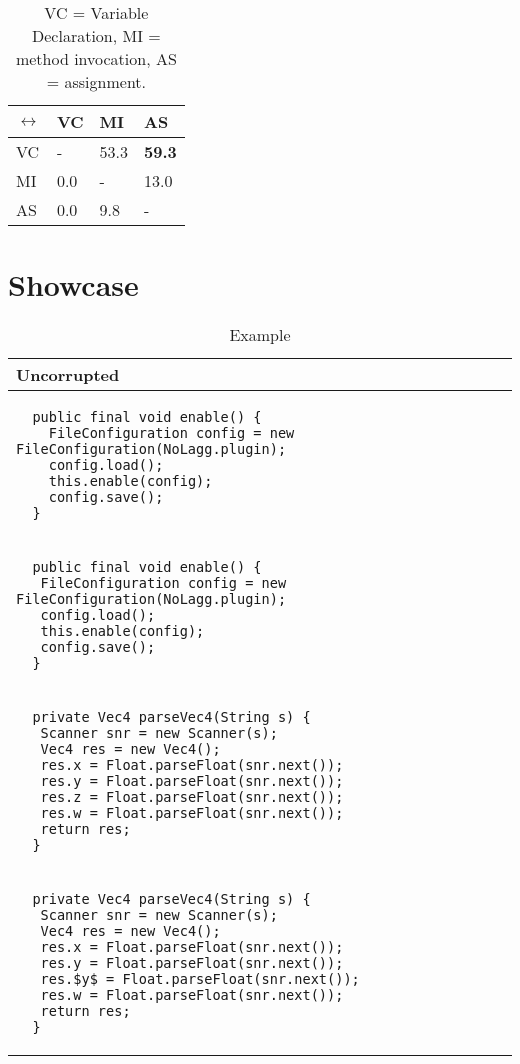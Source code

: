 \begin{table}[h]
\begin{tabular}{ | m{1cm} | m{1cm} | m{1cm} | m{1cm} | }
  \hline
  \(\leftrightarrow\) & VC & MI & AS \\
  \hline
  \hline
  VC & - & 53.3 & \textbf{59.3} \\
  \hline
  MI & 0.0 & - & 13.0 \\
  \hline
  AS & 0.0 & 9.8 & - \\
  \hline
\end{tabular}
\caption{VC = Variable Declaration, MI = method invocation, AS = assignment.}
\label{switch_table}
\end{table}

\section{Showcase}

\begin{table}[p]
\begin{tabular}{ | m{11cm} | }
  \hline
  Uncorrupted \\
  \hline
  \begin{lstlisting}
  public final void enable() {
    FileConfiguration config = new FileConfiguration(NoLagg.plugin);
    config.load();
    this.enable(config);
    config.save();
  }
  \end{lstlisting} \\
  \begin{lstlisting}
  public final void enable() {
   FileConfiguration config = new FileConfiguration(NoLagg.plugin);
   config.load();
   this.enable(config);
   config.save();
  }
  \end{lstlisting} \\
  \hline
  \hline
  \begin{lstlisting}
  private Vec4 parseVec4(String s) {
   Scanner snr = new Scanner(s);
   Vec4 res = new Vec4();
   res.x = Float.parseFloat(snr.next());
   res.y = Float.parseFloat(snr.next());
   res.z = Float.parseFloat(snr.next());
   res.w = Float.parseFloat(snr.next());
   return res;
  }
  \end{lstlisting} \\
  \begin{lstlisting}
  private Vec4 parseVec4(String s) {
   Scanner snr = new Scanner(s);
   Vec4 res = new Vec4();
   res.x = Float.parseFloat(snr.next());
   res.y = Float.parseFloat(snr.next());
   res.$y$ = Float.parseFloat(snr.next());
   res.w = Float.parseFloat(snr.next());
   return res;
  }
  \end{lstlisting} \\
  \hline
\end{tabular}
\caption{Example}
\label{uncorrupted_showcase_table}
\end{table}


